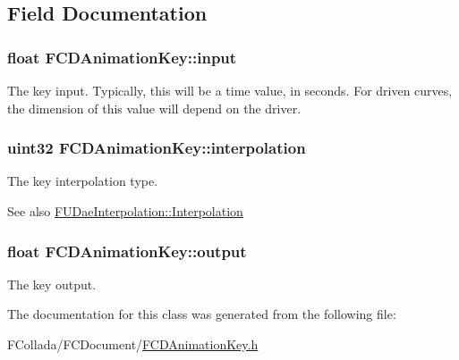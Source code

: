 \subsection{Field Documentation}
\hypertarget{classFCDAnimationKey_a1591f4d28aac7dff40d92b0308809a7f}{
\subsubsection[{input}]{\setlength{\rightskip}{0pt plus 5cm}float {\bf FCDAnimationKey::input}}}
\label{classFCDAnimationKey_a1591f4d28aac7dff40d92b0308809a7f}
The key input. Typically, this will be a time value, in seconds. For driven curves, the dimension of this value will depend on the driver. \hypertarget{classFCDAnimationKey_a09ea6034885bc7a3c8af91afa68a52ed}{
\subsubsection[{interpolation}]{\setlength{\rightskip}{0pt plus 5cm}uint32 {\bf FCDAnimationKey::interpolation}}}
\label{classFCDAnimationKey_a09ea6034885bc7a3c8af91afa68a52ed}
The key interpolation type. \begin{DoxySeeAlso}{See also}
\hyperlink{namespaceFUDaeInterpolation_a209a941c2fb6ece1325352968aa0374f}{FUDaeInterpolation::Interpolation} 
\end{DoxySeeAlso}
\hypertarget{classFCDAnimationKey_aa779e0e946f47dbc9a2d6b9eeb58d6c2}{
\subsubsection[{output}]{\setlength{\rightskip}{0pt plus 5cm}float {\bf FCDAnimationKey::output}}}
\label{classFCDAnimationKey_aa779e0e946f47dbc9a2d6b9eeb58d6c2}
The key output. 

The documentation for this class was generated from the following file:\begin{DoxyCompactItemize}
\item 
FCollada/FCDocument/\hyperlink{FCDAnimationKey_8h}{FCDAnimationKey.h}\end{DoxyCompactItemize}
